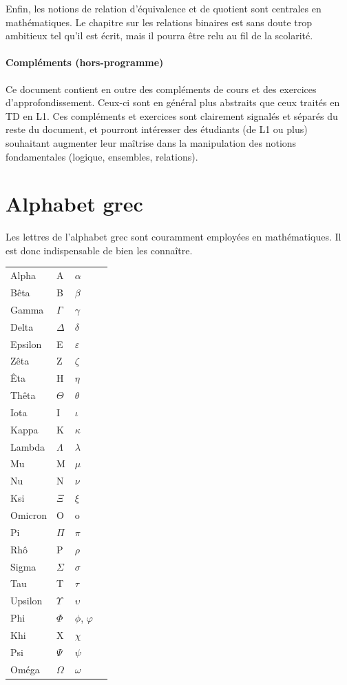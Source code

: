 \documentclass[11pt,a4paper]{book}
\theoremstyle{definition}
\theoremstyle{plain}
\begin{document}
Enfin, les notions de relation d'équivalence et de quotient sont centrales en mathématiques. Le chapitre sur les relations binaires est sans doute trop ambitieux tel qu'il est écrit, mais il pourra être relu au fil de la scolarité.

\paragraph{Compléments (hors-programme)} Ce document contient en outre des compléments de cours et des exercices d'approfondissement. Ceux-ci  sont en général plus abstraits que ceux traités en TD en L1. Ces compléments et exercices sont clairement signalés et séparés du reste du document, et pourront intéresser des étudiants (de L1 ou plus) souhaitant augmenter leur maîtrise dans la manipulation des notions fondamentales (logique, ensembles, relations).

\newpage
\section{Alphabet grec}

\noindent Les lettres de l'alphabet grec sont couramment employées en mathématiques. Il est donc indispensable de bien les connaître.

\begin{center}

\def\arraystretch{1.2}
\setlength\tabcolsep{20pt}
\begin{tabular}{llll}
Alpha		& A 			& $\alpha$\\
Bêta			& B 			& $\beta$\\
Gamma		& $\Gamma$ 	& $\gamma$\\
Delta		& $\Delta$ 	& $\delta$\\
Epsilon		& E 			& $\varepsilon$\\
Zêta			& Z 			& $\zeta$\\
Êta			& H 			& $\eta$\\
Thêta		& $\Theta$ 	& $\theta$\\
Iota			& I 			& $\iota$\\
Kappa		& K 			& $\kappa$\\
Lambda		& $\Lambda$ 	& $\lambda$\\
Mu			& M 			& $\mu$\\
Nu			& N 			& $\nu$\\
Ksi			& $\Xi$ 		& $\xi$\\
Omicron		& O 			& o\\
Pi			& $\Pi$ 		& $\pi$\\
Rhô			& P 			& $\rho$\\
Sigma		& $\Sigma$ 	& $\sigma$\\
Tau			& T 			& $\tau$\\
Upsilon		& $\Upsilon$& $\upsilon$\\
Phi			& $\Phi$ 	& $\phi$, $\varphi$\\
Khi			& X 			& $\chi$\\
Psi			& $\Psi$ 	& $\psi$ \\
Oméga		& $\Omega$ 	& $\omega$\\
\end{tabular}
\end{center}
\end{document}
